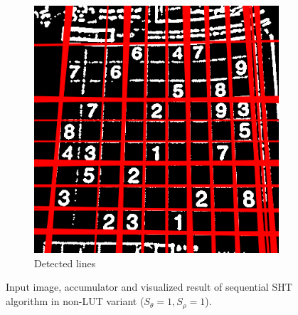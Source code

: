 \begin{figure}[]
\begin{subfigure}{0.3\textwidth}
        \includegraphics[width=\linewidth] {img/sht_result.png}
        \caption{Detected lines}\label{fig:sht_example:c}
    \end{subfigure}
    \caption{Input image, accumulator and visualized result of sequential SHT algorithm in non-LUT variant ($S_\theta = 1, S_\rho=1$).}\label{fig:sht_example}
\end{figure}
